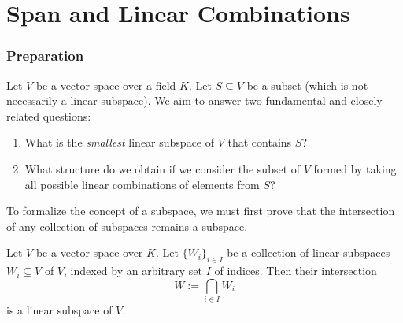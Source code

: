 \renewcommand{\thetheorem}{8.\arabic{theorem}}
\setcounter{theorem}{0}
%
\usetikzlibrary{positioning}  %
\usetikzlibrary{arrows.meta}  %
\usetikzlibrary{shapes}       %
\setcounter{chapter}{7}

\chapter{Span and Linear Combinations}

\subsection{Preparation}

Let $V$ be a vector space over a field $K$. Let $S \subseteq V$ be a subset (which is not necessarily a linear subspace). We aim to answer two fundamental and closely related questions:
\begin{enumerate}[label=\textbf{(\alph*)}]
    \item What is the \emph{smallest} linear subspace of $V$ that contains $S$?
    \item What structure do we obtain if we consider the subset of $V$ formed by taking all possible linear combinations of elements from $S$?
\end{enumerate}

To formalize the concept of a  subspace, we must first prove that the intersection of any collection of subspaces remains a subspace.

\begin{lemma}
\label{lem:intersection_of_subspaces}
Let $V$ be a vector space over $K$. Let $\{W_i\}_{i \in I}$ be a collection of linear subspaces $W_i \subseteq V$ of $V$, indexed by an arbitrary set $I$ of indices. Then their intersection
\[
W := \bigcap_{i \in I} W_i
\]
is a linear subspace of $V$.
\end{lemma}


